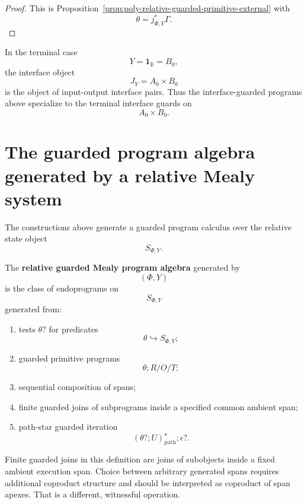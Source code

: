 \begin{proof}
This is Proposition~\ref{prop:poly-relative-guarded-primitive-external} with
\[
\theta=j_{\Phi,Y}^\ast\Gamma.
\]
\end{proof}

\begin{remark}
\label{rem:poly-relative-terminal-interface-guards}
In the terminal case
\[
Y=\mathbf 1_{\mathbb B}=B_0,
\]
the interface object
\[
J_Y=A_0\times B_0
\]
is the object of input-output interface pairs.  Thus the interface-guarded
programs above specialize to the terminal interface guards on
\[
A_0\times B_0.
\]
\end{remark}

\section{The guarded program algebra generated by a relative Mealy system}
\label{sec:poly-relative-guarded-program-algebra}

The constructions above generate a guarded program calculus over the relative
state object
\[
S_{\Phi,Y}.
\]

\begin{definition}
\label{def:poly-relative-guarded-program-algebra}
The \textbf{relative guarded Mealy program algebra} generated by
\[
(\Phi,Y)
\]
is the class of endoprograms on
\[
S_{\Phi,Y}
\]
generated from:
\begin{enumerate}
\item tests \(\theta?\) for predicates
\[
\theta\hookrightarrow S_{\Phi,Y};
\]
\item guarded primitive programs
\[
\theta;R/O/T;
\]
\item sequential composition of spans;
\item finite guarded joins of subprograms inside a specified common ambient
span;
\item path-star guarded iteration
\[
(\theta?;U)^\star_{\mathrm{path}};\epsilon?.
\]
\end{enumerate}
\end{definition}

\begin{remark}
\label{rem:poly-relative-common-ambient-spans}
Finite guarded joins in this definition are joins of subobjects inside a fixed
ambient execution span.  Choice between arbitrary generated spans requires
additional coproduct structure and should be interpreted as coproduct of span
apexes.  That is a different, witnessful operation.
\end{remark}

